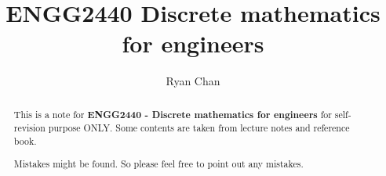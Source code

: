 \documentclass[a4paper]{report}
\author{Ryan Chan}
\title{ENGG2440 Discrete mathematics for engineers}
\begin{document}
\setlength\parindent{0pt}

\maketitle
\newpage

\begin{abstract}
	This is a note for \textbf{ENGG2440 - Discrete mathematics for engineers} for self-revision purpose ONLY. Some contents are taken from lecture notes and reference book. 
	
	Mistakes might be found. So please feel free to point out any mistakes.
\end{abstract}

\newpage

\tableofcontents

\setlength{\parskip}{5pt}
\end{document}
